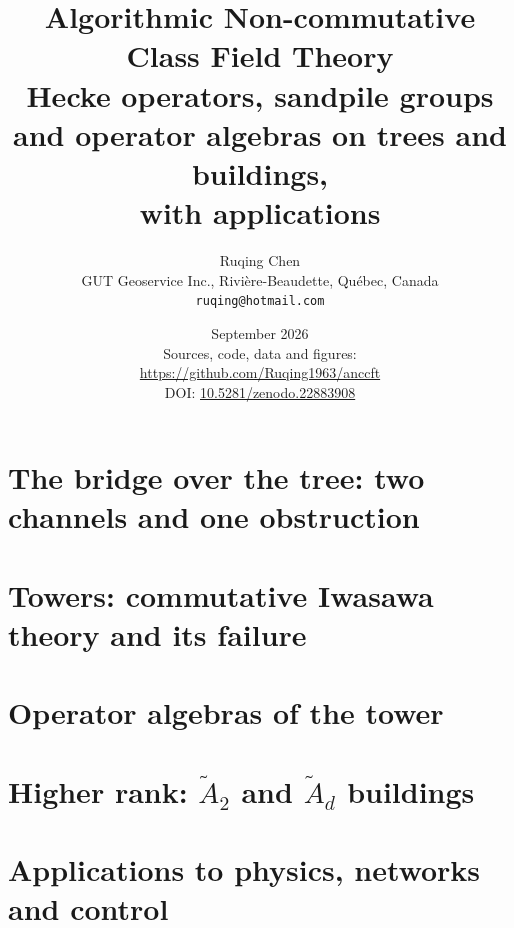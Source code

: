 \documentclass[11pt,twoside,openright]{book}
\title{\bfseries Algorithmic Non-commutative Class Field Theory\\[6pt]
\large Hecke operators, sandpile groups and operator algebras on trees and buildings,\\ with applications}
\author{Ruqing Chen\\[4pt]\normalsize GUT Geoservice Inc., Rivi\`ere-Beaudette, Qu\'ebec, Canada\\
\normalsize\texttt{ruqing@hotmail.com}}
\date{September 2026\\[10pt]\normalsize Sources, code, data and figures:\\
\url{https://github.com/Ruqing1963/anccft}\\[6pt]
\normalsize DOI: \href{https://doi.org/10.5281/zenodo.22883908}{10.5281/zenodo.22883908}}
\numberwithin{equation}{section}
\theoremstyle{plain}
\theoremstyle{definition}
\theoremstyle{remark}
\begin{document}
\frontmatter
\maketitle

\tableofcontents

\mainmatter

\part{The bridge over the tree: two channels and one obstruction}




\part{Towers: commutative Iwasawa theory and its failure}







\part{Operator algebras of the tower}



\part{\texorpdfstring{Higher rank: $\widetilde A_2$ and $\widetilde A_d$ buildings}{Higher rank: A2 and Ad buildings}}






\part{Applications to physics, networks and control}





\backmatter

\end{document}
